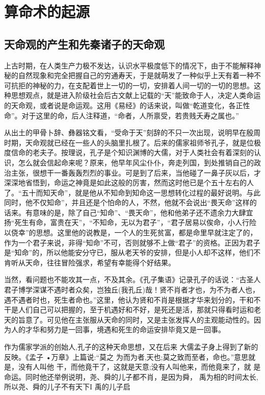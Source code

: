 \chapter{算命术的起源}
\section{天命观的产生和先秦诸子的天命观}
上古时期，在人类生产力极不发达，认识水平极度低下的情况下，由于不能解释神秘的自然现象和完全把握自己的穷通寿天，于是就萌发了一种似乎上天有着一种不可抗拒的神秘的力，在支配着世上一切的一切，安排着人间一切的一切的思想。这种思想观点，就是进入阶级社会后古文献上记载的“天”能致命于人，决定人类命运的天命观，或者说是命运观。这用《易经》的话来说，叫做“乾道变化，各正性命”。对于这里的命，后人注释道，“命者，人所禀受，若贵贱夭寿之属也。”


从出土的甲骨卜辞、彝器铭文看，“受命于天”刻辞的不只一次出现，说明早在殷周时期，天命观就已经在一些人的头脑里扎根了。后来的儒家祖师爷孔子，就是位极度信命的老夫子。按理说，孔子是个知识渊博的大儒，对于人类社会有着深刻的认识，怎么就会信起命来呢？原来，他早年风尘仆仆，奔走列国，到处推销自己的政治主张，很想干一番轰轰烈烈的事业。可是到了后来，当他碰了一鼻子灰以后，才深深地省悟到，命运之神竟是如此这般的厉害，然而这时他已是个五十左右的人了。“五十而知天命”，就是他从不知命到知命这一思想转化过程的最好说明。与此同时，他不仅知命”，并且还是个怕命的人，不然，他就不会说出“畏天命”这样的话来。有意味的是，除了自己“知命”、“畏天命”，他和他弟子还不遗余力大肆宜扬“死生有命，富贵在天”，“不知命，无以为君子”，“君子居易以俟命，小人行险以侥幸”的思想。这里他的说教是，一个人的生死贫富，都是命里早就注定了的，作为一个君子来说，非得“知命”不可，否则就够不上做“君子”的资格。正因为君子是“知命”的，所以他能安分守已，服从老天爷的安排，但是小人却不这样，他们不肯听从天命，往往冒险强求，希望有幸能得个好结果。


当然，看问题也不能攻其一点，不及其余。《孔子集语》记录孔子的话说：“古圣人君子博学深谋不遇时者众矣，岂独丘(我孔丘)哉！贤不肖者才也，为不为者人也，遇不遇者时也，死生者命也。”这里，他认为贤和不肖是根据才华来划分的，干和不干是人们自己可以把握的，至于机遇好和不好，是死还是活，那就只得看时运和老天的旨意了。可见他在主张服从天命的同时，又是主张发挥人的主观能动性的。因为人的才华和努力是一回事，境遇和死生的命运安排毕竟又是一回事。

作为儒家学派的创始人,孔子的这种天命思想，又在后来
大儒孟子身上得到了新的反映。《孟子 •万章》上篇说:“莫之
为而为者,天也;莫之致而至者，命也。”意思就是，没有人叫他
干，而他竟干了，这就是天意;没有人叫他来，而他竟来了，就
是命运。同时他还举例说明，尧、舜的儿子都不肖，是因为舜，
禹为相的时间太长,所以尧、舜的儿子不有天下I 禹的儿子启

